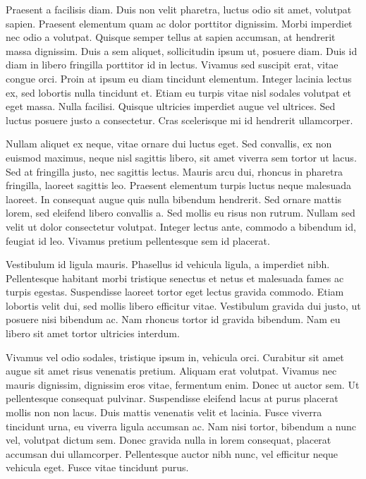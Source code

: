 \documentclass[11pt]{article}
\begin{document}
Praesent a facilisis diam. Duis non velit pharetra, luctus odio sit
amet, volutpat sapien. Praesent elementum quam ac dolor porttitor
dignissim. Morbi imperdiet nec odio a volutpat. Quisque semper tellus at
sapien accumsan, at hendrerit massa dignissim. Duis a sem aliquet,
sollicitudin ipsum ut, posuere diam. Duis id diam in libero fringilla
porttitor id in lectus. Vivamus sed suscipit erat, vitae congue orci.
Proin at ipsum eu diam tincidunt elementum. Integer lacinia lectus ex,
sed lobortis nulla tincidunt et. Etiam eu turpis vitae nisl sodales
volutpat et eget massa. Nulla facilisi. Quisque ultricies imperdiet
augue vel ultrices. Sed luctus posuere justo a consectetur. Cras
scelerisque mi id hendrerit ullamcorper.

Nullam aliquet ex neque, vitae ornare dui luctus eget. Sed convallis, ex
non euismod maximus, neque nisl sagittis libero, sit amet viverra sem
tortor ut lacus. Sed at fringilla justo, nec sagittis lectus. Mauris
arcu dui, rhoncus in pharetra fringilla, laoreet sagittis leo. Praesent
elementum turpis luctus neque malesuada laoreet. In consequat augue quis
nulla bibendum hendrerit. Sed ornare mattis lorem, sed eleifend libero
convallis a. Sed mollis eu risus non rutrum. Nullam sed velit ut dolor
consectetur volutpat. Integer lectus ante, commodo a bibendum id,
feugiat id leo. Vivamus pretium pellentesque sem id placerat.

Vestibulum id ligula mauris. Phasellus id vehicula ligula, a imperdiet
nibh. Pellentesque habitant morbi tristique senectus et netus et
malesuada fames ac turpis egestas. Suspendisse laoreet tortor eget
lectus gravida commodo. Etiam lobortis velit dui, sed mollis libero
efficitur vitae. Vestibulum gravida dui justo, ut posuere nisi bibendum
ac. Nam rhoncus tortor id gravida bibendum. Nam eu libero sit amet
tortor ultricies interdum.

Vivamus vel odio sodales, tristique ipsum in, vehicula orci. Curabitur
sit amet augue sit amet risus venenatis pretium. Aliquam erat volutpat.
Vivamus nec mauris dignissim, dignissim eros vitae, fermentum enim.
Donec ut auctor sem. Ut pellentesque consequat pulvinar. Suspendisse
eleifend lacus at purus placerat mollis non non lacus. Duis mattis
venenatis velit et lacinia. Fusce viverra tincidunt urna, eu viverra
ligula accumsan ac. Nam nisi tortor, bibendum a nunc vel, volutpat
dictum sem. Donec gravida nulla in lorem consequat, placerat accumsan
dui ullamcorper. Pellentesque auctor nibh nunc, vel efficitur neque
vehicula eget. Fusce vitae tincidunt purus.
\end{document}
